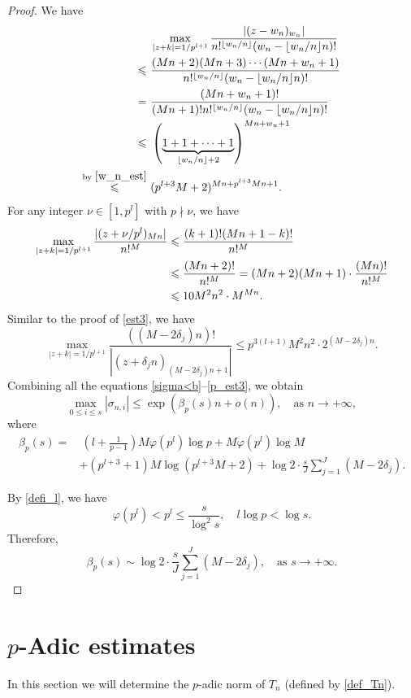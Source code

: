 \documentclass[12pt]{article}
\numberwithin{equation}{section}
\begin{document}
\begin{proof}
We have
\begin{align}
&~ \max_{|z+k|=1/p^{l+1}} \frac{|(z-w_n)_{w_n}|}{n!^{\lfloor w_n / n\rfloor}(w_n-\lfloor w_n / n\rfloor n)!} \notag\\
\leqslant&~  \frac{(Mn+2)(Mn+3)\cdots(Mn+w_n+1)}{n!^{\lfloor w_n / n\rfloor}(w_n-\lfloor w_n / n\rfloor n)!} \notag\\
=&~ \frac{(Mn+w_n+1)!}{(Mn+1)!n!^{\lfloor w_n / n\rfloor}(w_n-\lfloor w_n / n\rfloor n)!} \notag\\
\leqslant&~ \left( \underbrace{1+1+\cdots+1}_{\lfloor w_n/n \rfloor + 2} \right)^{Mn+w_n+1} \notag\\
\overset{\text{by~} \eqref{w_n_est}}{\leqslant}&~    (p^{l+3}M+2)^{Mn+p^{l+3}Mn + 1}. \label{p_est1}
\end{align}
For any integer $\nu \in [1,p^l]$ with $p \nmid \nu$, we have
\begin{align}
\max_{|z+k|=1/p^{l+1}} \frac{|(z+\nu/p^{l})_{Mn}|}{n!^M} &\leqslant \frac{(k+1)!(Mn+1-k)!}{n!^M} \notag\\
&\leqslant \frac{(Mn+2)!}{n!^M} = (Mn+2)(Mn+1) \cdot \frac{(Mn)!}{n!^M} \notag\\
& \leqslant 10M^2n^2 \cdot M^{Mn}. \label{p_est2}
\end{align}
Similar to the proof of \eqref{est3}, we have
\begin{equation}\label{p_est3}
	\max_{|z+k| = 1/p^{l+1}} \frac{((M-2\delta_j)n)!}{|(z+\delta_jn)_{(M-2\delta_j)n+1}|} \leqslant p^{3(l+1)}M^2n^2 \cdot 2^{(M-2\delta_j)n}.
\end{equation}
Combining all the equations \eqref{sigma<b}--\eqref{p_est3}, we obtain
\[ \max_{0 \leqslant i \leqslant s} |\sigma_{n,i}| \leqslant \exp\left( \beta_p(s)n + o(n) \right), \quad \text{as~} n \to +\infty,  \]
where
\begin{align*}
\beta_p(s) =&~ \left( l+\frac{1}{p-1} \right)M\varphi(p^l)\log p + M\varphi(p^l)\log M \\
&+ (p^{l+3}+1)M\log(p^{l+3}M+2) + \log 2 \cdot \frac{s}{J} \sum_{j=1}^{J} (M - 2\delta_j). 
\end{align*}
 
By \eqref{defi_l}, we have
\[ \varphi(p^l)<p^l \leqslant \frac{s}{\log^2 s}, \quad l\log p < \log s. \]
Therefore, 
\[ \beta_p(s) \sim \log2 \cdot \frac{s}{J} \sum_{j=1}^{J} (M - 2\delta_j), \quad\text{as~} s \to +\infty.  \]
\end{proof}

\bigskip

\section{$p$-Adic estimates}\label{Sect_p_adic_est}
In this section we will determine the $p$-adic norm of $T_n$ (defined by \eqref{def_Tn}). 
\end{document}
